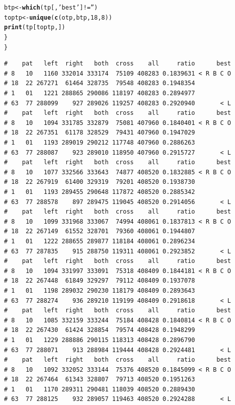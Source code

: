 \documentclass{article}\usepackage[]{graphicx}\usepackage[]{color}
\makeatletter
\newcommand{\hlnum}[1]{\textcolor[rgb]{0.686,0.059,0.569}{#1}}%
\newcommand{\hlstr}[1]{\textcolor[rgb]{0.192,0.494,0.8}{#1}}%
\newcommand{\hlopt}[1]{\textcolor[rgb]{0,0,0}{#1}}%
\newcommand{\hlstd}[1]{\textcolor[rgb]{0.345,0.345,0.345}{#1}}%
\newcommand{\hlkwb}[1]{\textcolor[rgb]{0.69,0.353,0.396}{#1}}%
\newcommand{\hlkwd}[1]{\textcolor[rgb]{0.737,0.353,0.396}{\textbf{#1}}}%
\newenvironment{kframe}{%
 \def\at@end@of@kframe{}%
 \ifinner\ifhmode%
  \def\at@end@of@kframe{\end{minipage}}%
  \begin{minipage}{\columnwidth}%
 \fi\fi%
 \def\FrameCommand##1{\hskip\@totalleftmargin \hskip-\fboxsep
 \colorbox{shadecolor}{##1}\hskip-\fboxsep
     \hskip-\linewidth \hskip-\@totalleftmargin \hskip\columnwidth}%
 \MakeFramed {\advance\hsize-\width
   \@totalleftmargin\z@ \linewidth\hsize
   \@setminipage}}%
 {\par\unskip\endMakeFramed%
 \at@end@of@kframe}
\newenvironment{knitrout}{}{} %
\makeatother
\begin{document}
\begin{knitrout}
\begin{kframe}
\begin{alltt}
    \hlstd{btp} \hlkwb{<-} \hlkwd{which}\hlstd{(tp[,}\hlstr{'best'}\hlstd{]} \hlopt{!=} \hlstr{''}\hlstd{)}
    \hlstd{toptp} \hlkwb{<-} \hlkwd{unique}\hlstd{(}\hlkwd{c}\hlstd{(otp,btp,}\hlnum{18}\hlstd{,}\hlnum{8}\hlstd{))}
    \hlkwd{print}\hlstd{(tp[toptp,])}
  \hlstd{\}}
\hlstd{\}}
\end{alltt}
\begin{verbatim}
#    pat   left  right   both  cross    all     ratio      best
# 8   10   1160 332014 333174  75109 408283 0.1839631 < R B C O
# 18  22 267271  61464 328735  79548 408283 0.1948354          
# 1   01   1221 288865 290086 118197 408283 0.2894977          
# 63  77 288099    927 289026 119257 408283 0.2920940       < L
#    pat   left  right   both  cross    all     ratio      best
# 8   10   1094 331785 332879  75081 407960 0.1840401 < R B C O
# 18  22 267351  61178 328529  79431 407960 0.1947029          
# 1   01   1193 289019 290212 117748 407960 0.2886263          
# 63  77 288087    923 289010 118950 407960 0.2915727       < L
#    pat   left  right   both  cross    all     ratio      best
# 8   10   1077 332566 333643  74877 408520 0.1832885 < R B C O
# 18  22 267919  61400 329319  79201 408520 0.1938730          
# 1   01   1193 289455 290648 117872 408520 0.2885342          
# 63  77 288578    897 289475 119045 408520 0.2914056       < L
#    pat   left  right   both  cross    all     ratio      best
# 8   10   1099 331968 333067  74994 408061 0.1837813 < R B C O
# 18  22 267149  61552 328701  79360 408061 0.1944807          
# 1   01   1222 288655 289877 118184 408061 0.2896234          
# 63  77 287835    915 288750 119311 408061 0.2923852       < L
#    pat   left  right   both  cross    all     ratio      best
# 8   10   1094 331997 333091  75318 408409 0.1844181 < R B C O
# 18  22 267448  61849 329297  79112 408409 0.1937078          
# 1   01   1198 289032 290230 118179 408409 0.2893643          
# 63  77 288274    936 289210 119199 408409 0.2918618       < L
#    pat   left  right   both  cross    all     ratio      best
# 8   10   1085 332159 333244  75184 408428 0.1840814 < R B C O
# 18  22 267430  61424 328854  79574 408428 0.1948299          
# 1   01   1229 288886 290115 118313 408428 0.2896790          
# 63  77 288071    913 288984 119444 408428 0.2924481       < L
#    pat   left  right   both  cross    all     ratio      best
# 8   10   1092 332052 333144  75376 408520 0.1845099 < R B C O
# 18  22 267464  61343 328807  79713 408520 0.1951263          
# 1   01   1170 289311 290481 118039 408520 0.2889430          
# 63  77 288125    932 289057 119463 408520 0.2924288       < L

\end{verbatim}
\end{kframe}
\end{knitrout}
\end{document}

